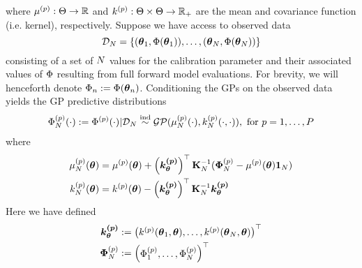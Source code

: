 \documentclass[12pt]{article}
\begin{document}
where $\mu^{(p)}: \Theta \to \mathbb{R}$ and $k^{(p)}: \Theta \times \Theta \to \mathbb{R}_+$ are the mean and covariance function (i.e. kernel), respectively. 
Suppose we have access to observed data 
\[\mathcal{D}_{N} = \left\{(\boldsymbol{\theta}_1, \Phi(\boldsymbol{\theta}_1)), \dots, (\boldsymbol{\theta}_{N}, \Phi(\boldsymbol{\theta}_{N})) \right\}\]
consisting of a set of $N$ values for the calibration parameter and their associated values of $\Phi$ resulting from full forward model evaluations. For brevity, we will henceforth denote 
$\Phi_{n} := \Phi(\boldsymbol{\theta}_{n})$. Conditioning the GPs on the observed data yields the GP predictive distributions
\begin{align} 
\Phi_{N}^{(p)}(\cdot) := {\Phi}^{(p)}(\cdot)|\mathcal{D}_{N} \overset{\text{ind}}{\sim} \mathcal{GP}(\mu_{N}^{(p)}(\cdot), k_{N}^{(p)}(\cdot, \cdot)), \text{ for } p = 1, \dots, P
\end{align}
where 
\begin{align}
\mu_{N}^{(p)}(\boldsymbol{\theta}) &= \mu^{(p)}(\boldsymbol{\theta}) + \left(\boldsymbol{k^{(p)}_{\boldsymbol{\theta}}}\right)^\top \mathbf{K}_{N}^{-1} (\boldsymbol{\Phi}_{N}^{(p)} - \mu^{(p)}(\boldsymbol{\theta}) \boldsymbol{1}_{N}) \label{GP_pred_mean} \\ 
k_{N}^{(p)}(\boldsymbol{\theta}) &= k^{(p)}(\boldsymbol{\theta}) - \left(\boldsymbol{k^{(p)}_{\boldsymbol{\theta}}}\right)^\top \mathbf{K}_{N}^{-1} \boldsymbol{k^{(p)}_{\boldsymbol{\theta}}} \label{GP_pred_var}
\end{align}
Here we have defined 
\begin{align}
\boldsymbol{k^{(p)}_{\boldsymbol{\theta}}} &:= \begin{pmatrix} k^{(p)}(\boldsymbol{\theta}_1, \boldsymbol{\theta}), \dots, k^{(p)}(\boldsymbol{\theta}_{N}, \boldsymbol{\theta})  \end{pmatrix}^\top \\ 
\boldsymbol{\Phi}_{N}^{(p)} &:= \begin{pmatrix} \Phi_{1}^{(p)}, \dots, \Phi_{N}^{(p)} \end{pmatrix}^{\top}
\end{align}

\end{document}
